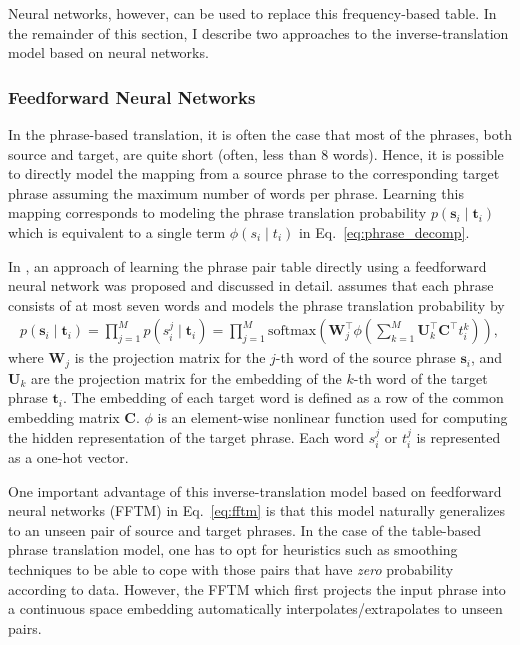\documentclass[11pt, oneside]{essay}
\newcommand{\softmax}{\text{softmax}}
\newcommand{\vect}[1]{\mathbf{#1}}
\newcommand{\matr}[1]{\mathbf{#1}}
\newcommand{\vs}[0]{\vect{s}}
\newcommand{\vt}[0]{\vect{t}}
\newcommand{\mW}[0]{\matr{W}}
\newcommand{\mU}[0]{\matr{U}}
\newcommand{\mC}{\matr{C}}
\begin{document}
Neural networks, however, can be used to replace this
frequency-based table. In the remainder of this section, I
describe two approaches to the inverse-translation model based on
neural networks.

\subsubsection{Feedforward Neural Networks}

In the phrase-based translation, it is often the case that most
of the phrases, both source and target, are quite short (often,
        less than $8$ words). Hence, it is possible to directly
model the mapping from a source phrase to the corresponding
target phrase assuming the maximum number of words per phrase.
Learning this mapping corresponds to modeling the phrase
translation probability $p(\vs_i \mid \vt_i)$ which is equivalent to
a single term $\phi(s_i \mid t_i)$ in
Eq.~\eqref{eq:phrase_decomp}.

In \citep{Schwenk2012,Son2012,Carpuat2007}, an approach of learning the phrase
pair table directly using a feedforward neural network was
proposed and discussed in detail. \citet{Schwenk2012} assumes that
each phrase consists of at most seven words and models the phrase
translation probability by
\begin{align}
\label{eq:fftm}
p(\vs_i \mid \vt_i) = \prod_{j=1}^M p(s_i^j \mid \vt_i) 
                     = \prod_{j=1}^M \softmax\left( \mW_j^\top
                             \phi \left( \sum_{k=1}^M \mU_k^\top
                                 \mC^\top t_i^k  \right) \right),
\end{align}
where $\mW_j$ is the projection matrix for the $j$-th word of the
source phrase $\vs_i$, and $\mU_k$ are the projection
matrix for the embedding of the $k$-th word of the target phrase
$\vt_i$. The embedding of each target word is defined as a row of
the common embedding matrix $\mC$. $\phi$ is an element-wise
nonlinear function used for computing the hidden representation
of the target phrase. Each word $s_i^j$ or $t_i^j$ is represented
as a one-hot vector.

One important advantage of this inverse-translation model based
on feedforward neural networks (FFTM) in Eq.~\eqref{eq:fftm} is
that this model naturally generalizes to an unseen pair of source
and target phrases. In the case of the table-based phrase
translation model, one has to opt for heuristics such as
smoothing techniques to be able to cope with those pairs that
have \textit{zero} probability according to data. However, the
FFTM which first projects the input phrase into a continuous
space embedding automatically interpolates/extrapolates to unseen
pairs.
\end{document}
